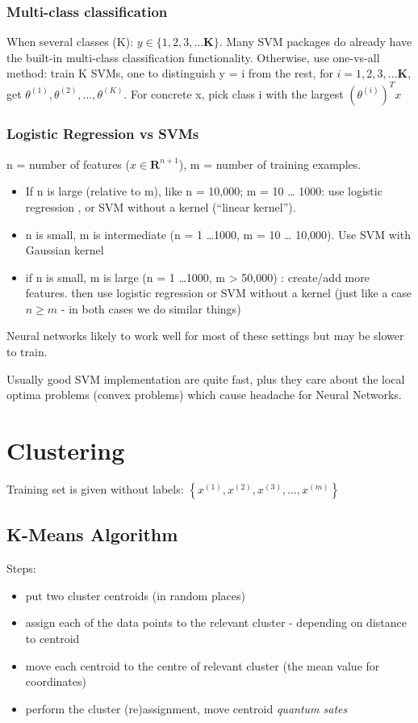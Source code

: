 \documentclass{scrartcl}
\begin{document}
\subsubsection{Multi-class classification}
\label{sec:12-6-1}
When several classes (K): $y \in \{1, 2, 3, \dots \mathbf{K} \}$. Many
SVM packages do already have the built-in multi-class classification
functionality. Otherwise, use one-vs-all method: train K SVMs, one to
distinguish y = i from the rest, for $i = 1, 2, 3, \dots \mathbf{K}$,
get $\theta^{(1)}, \theta^{(2)}, \dots , \theta^{(K)}$. For concrete
x, pick class i with the largest $(\theta^{(i)})^T x$

\subsubsection{Logistic Regression vs SVMs}
n = number of features ($x \in \mathbf{R}^{n+1}$), m = number of
training examples.
\begin{itemize}
\item If n is large (relative to m), like n = 10,000; m = 10 \ldots
  1000: use logistic regression , or SVM without a kernel (``linear
  kernel'').
\item n is small, m is intermediate (n = 1 \ldots 1000, m = 10 \ldots
  10,000). Use SVM with Gaussian kernel
\item if n is small, m is large (n = 1 \ldots 1000, m > 50,000) :
  create/add more features. then use logistic regression or SVM
  without a kernel (just like a case $n \geq m$ - in both cases we do
  similar things)
\end{itemize}

Neural networks likely to work well for most of these settings but may
be slower to train.

Usually good SVM implementation are quite fast, plus they care about
the local optima problems (convex problems) which cause headache for
Neural Networks.

\section{Clustering}
\label{sec:13}

Training set is given without labels: $\left\{ x^{(1)}, x^{(2)},
  x^{(3)}, \dots , x^{(m)} \right\}$

\subsection{K-Means Algorithm}
\label{sec:13-2}
Steps:
\begin{itemize}
\item put two cluster centroids (in random places)
\item assign each of the data points to the relevant cluster -
  depending on distance to centroid
\item move each centroid to the centre of relevant cluster (the mean
  value for coordinates)
\item perform the cluster (re)assignment, move centroid {\it quantum sates}  
\end{itemize}
\end{document}
